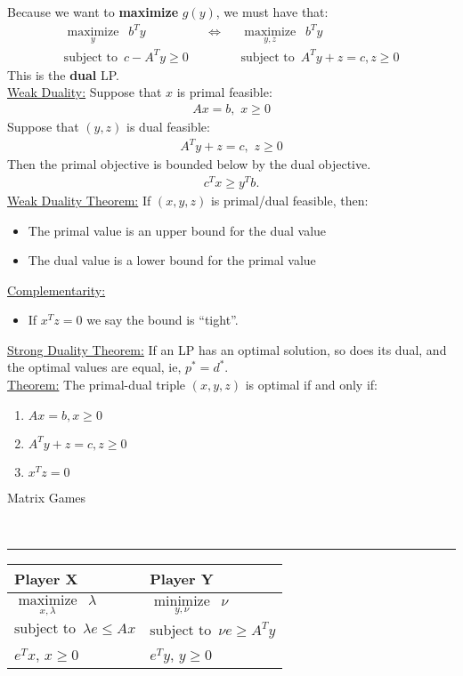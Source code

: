 \documentclass{article}
\newcommand{\header}[1]{\begin{large}\noindent #1\end{large}\\\rule{\textwidth}{0.5pt}}
\newcommand{\sheader}[1]{\underline{#1:}}
\newcommand{\gap}{\medskip\\}
\newcommand{\oper}[2]{\underset{#2}{\operatorname{#1}}}
\begin{document}
Because we want to \textbf{maximize} $g(y)$, we must have that:
\begin{align*}
    \oper{maximize}{y} \,\,\, b^Ty && \iff && \oper{maximize}{y, z}\,\,\, b^Ty\\
    \textrm{subject to}\,\,\, c-A^Ty \geq 0 && && \textrm{subject to} \,\,\, A^Ty + z = c, z\geq 0
\end{align*}
This is the \textbf{dual} LP.
\gap
\sheader{Weak Duality} Suppose that $x$ is primal feasible:
\begin{align*}
    Ax = b,\,\, x\geq 0
\end{align*}
Suppose that $(y,z)$ is dual feasible:
\begin{align*}
    A^Ty + z = c, \,\, z \geq 0
\end{align*}
Then the primal objective is bounded below by the dual objective.
\begin{align*}
    c^Tx \geq y^T b.
\end{align*}
\sheader{Weak Duality Theorem} If $(x, y, z)$ is primal/dual feasible,
then:
\begin{itemize}
    \item The primal value is an upper bound for the dual value
    \item The dual value is a lower bound for the primal value
\end{itemize}

\sheader{Complementarity}
\begin{itemize}
    \item If $x^Tz= 0$ we say the bound is ``tight''.
\end{itemize}

\sheader{Strong Duality Theorem} If an LP has an optimal solution, so 
does its dual, and the optimal values are equal, ie, $p^* = d^*$.
\gap
\sheader{Theorem} The primal-dual triple $(x, y, z)$ is optimal if and 
only if:
\begin{enumerate}[(1)]
    \item $Ax = b, x\geq 0$
    \item $A^Ty + z = c, z\geq 0$
    \item $x^Tz = 0$
\end{enumerate}
\header{Matrix Games}
\begin{center}
    \begin{tabular}{|l|l|}
        \hline
        Player X & Player Y \\
        \hline
        $\oper{maximize}{x, \lambda}\,\,\, \lambda$ & $\oper{minimize}{y, \nu} \,\,\, \nu $\\
        $\textrm{subject to} \,\,\, \lambda e \leq Ax$ & $\textrm{subject to} \,\,\, \nu e \geq A^Ty$\\
        \hspace{1.7cm}$e^Tx$, $x\geq 0$ &\hspace{1.7cm}$e^Ty$, $y\geq 0$\\
        \hline
    \end{tabular}
\end{center}
\pagebreak
\end{document}
